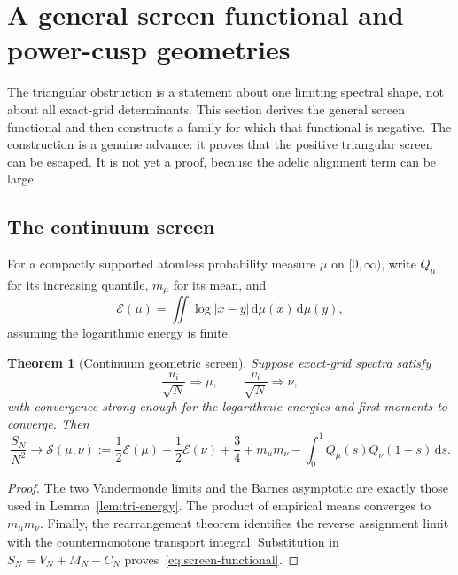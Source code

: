 \documentclass[11pt]{article}
\newcommand{\dd}{\,\mathrm d}
\newcommand{\1}{\mathbf 1}
\theoremstyle{plain}
\newtheorem{theorem}{Theorem}[section]
\theoremstyle{definition}
\theoremstyle{remark}
\begin{document}
\section{A general screen functional and power-cusp geometries}
\label{sec:cusp}

The triangular obstruction is a statement about one limiting spectral shape,
not about all exact-grid determinants.  This section derives the general
screen functional and then constructs a family for which that functional is
negative.  The construction is a genuine advance: it proves that the positive
triangular screen can be escaped.  It is not yet a proof, because the adelic
alignment term can be large.

\subsection{The continuum screen}

For a compactly supported atomless probability measure $\mu$ on $[0,\infty)$,
write $Q_\mu$ for its increasing quantile, $m_\mu$ for its mean, and
\begin{equation}\label{eq:log-energy}
 \mathcal E(\mu)=\iint\log|x-y|\dd\mu(x)\dd\mu(y),
\end{equation}
assuming the logarithmic energy is finite.

\begin{theorem}[Continuum geometric screen]\label{thm:continuum-screen}
Suppose exact-grid spectra satisfy
\[
 \frac{u_i}{\sqrt N}\Longrightarrow\mu,
 \qquad
 \frac{v_i}{\sqrt N}\Longrightarrow\nu,
\]
with convergence strong enough for the logarithmic energies and first
moments to converge.  Then
\begin{equation}\label{eq:screen-functional}
 \frac{S_N}{N^2}\longrightarrow
 \mathscr S(\mu,\nu):=
 \frac12\mathcal E(\mu)+\frac12\mathcal E(\nu)+\frac34
 +m_\mu m_\nu
 -\int_0^1Q_\mu(s)Q_\nu(1-s)\dd s.
\end{equation}
\end{theorem}

\begin{proof}
The two Vandermonde limits and the Barnes asymptotic are exactly those used in
Lemma~\ref{lem:tri-energy}.  The product of empirical means converges to
$m_\mu m_\nu$.  Finally, the rearrangement theorem identifies the reverse
assignment limit with the countermonotone transport integral.  Substitution
in $S_N=V_N+M_N-C_N^-$ proves~\eqref{eq:screen-functional}.
\end{proof}
\end{document}
